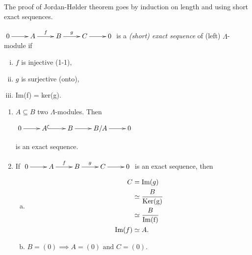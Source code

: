 The proof of Jordan-Hølder theorem goes by induction on length and using short exact sequences.
\begin{defin}
	$\xymatrix{0 \ar[r] & A\ar[r]^f & B\ar[r]^g & C \ar[r] & 0}$
        is a \emph{(short) exact sequence} of
        (left) $\Lambda$-module if 
	\begin{enumerate}[(i)]
		\item $f$ is injective (1-1),
		\item $g$ is surjective (onto),
		\item Im(f) = ker(g).
	\end{enumerate}
\end{defin} 
\begin{note}
	\begin{enumerate}[(1)]
		\item $A \subseteq B$ two  $\Lambda$-modules.  Then\\
		\begin{center}
			$\xymatrix{0 \ar[r] & A\ar@{^(->}[r] & B\ar[r] & B/A \ar[r] & 0}$
		\end{center}
	is an exact sequence.
	\item If $\xymatrix{0 \ar[r] & A\ar[r]^f & B\ar[r]^g & C \ar[r] & 0}$ is an exact sequence, then
	\begin{enumerate}[(a)]
        \item \begin{align}
                C & = \text{Im}(g)\notag\\
                  & \simeq \frac{B}{\text{Ker(g)}}\notag\\
                  & \simeq \frac{B}{\text{Im(f)}}\notag\\
                \text{Im}(f) & \simeq A\notag.
                   \end{align}
		\item $B = (0) \implies A = (0) \text{ and } C=(0). $ 
	\end{enumerate}
	\end{enumerate}
\end{note}

